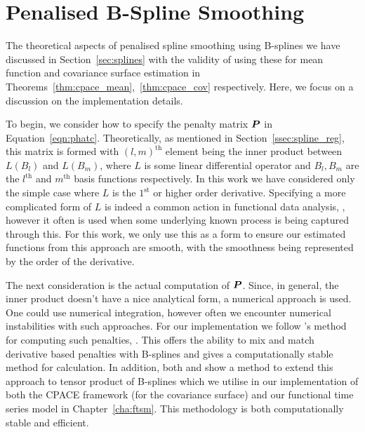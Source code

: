 \section{Penalised B-Spline Smoothing \label{sec:psplines}}
The theoretical aspects of penalised spline smoothing using B-splines we have discussed in Section~\ref{sec:splines} with the validity of using these for mean function and covariance surface estimation in Theorems~\ref{thm:cpace_mean},~\ref{thm:cpace_cov} respectively.
Here, we focus on a discussion on the implementation details.

To begin, we consider how to specify the penalty matrix $\bm{{P}}$ in Equation~\ref{eqn:phatc}.
Theoretically, as mentioned in Section~\ref{ssec:spline_reg}, this matrix is formed with $\left(l, m\right)^\text{th}$ element being the inner product between $L\left(B_l \right)$ and $L\left(B_m\right)$, where $L$ is some linear differential operator and $B_l, B_m$ are the $l^\text{th}$ and $m^\text{th}$ basis functions respectively.
In this work we have considered only the simple case where $L$ is the $1^\text{st}$ or higher order derivative.
Specifying a more complicated form of $L$ is indeed a common action in functional data analysis, \citep{ramsay_functional_2010}, however it often is used when some underlying known process is being captured through this.
For this work, we only use this as a form to ensure our estimated functions from this approach are smooth, with the smoothness being represented by the order of the derivative. 

The next consideration is the actual computation of $\bm{{P}}$. 
Since, in general, the inner product doesn't have a nice analytical form, a numerical approach is used.
One could use numerical integration, however often we encounter numerical instabilities with such approaches.
For our implementation we follow \citeauthor{wood_p-splines_2017}'s method for computing such penalties, \citep{wood_p-splines_2017}.
This offers the ability to mix and match derivative based penalties with B-splines and \citep{wood_p-splines_2017} gives a computationally stable method for calculation.
In addition, both \citep{wood_p-splines_2017} and \citep{wood_low-rank_2006} show a method to extend this approach to tensor product of B-splines which we utilise in our implementation of both the CPACE framework (for the covariance surface) and our functional time series model in Chapter~\ref{cha:ftsm}.
This methodology is both computationally stable and efficient.

